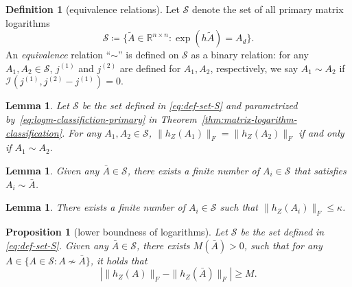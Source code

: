 \documentclass[letterpaper,10pt,journal,final]{IEEEtran}
\newtheorem{lemma}[theorem]{Lemma}
\newtheorem{proposition}[theorem]{Proposition}
\theoremstyle{definition}
\newtheorem{definition}[theorem]{Definition}
\theoremstyle{remark}
\begin{document}
\begin{definition}[equivalence relations]
  \label{def:equivalence-relation}
  Let $\mathcal{S}$ denote the set of all primary matrix logarithms
  \begin{equation}
    \label{eq:def-set-cal-S}
    \mathcal{S} \coloneqq \big\{\tilde{A} \in \mathbb{R}^{n \times n}: \exp(h \tilde{A}) = A_d \big\}.
  \end{equation}
  An \emph{equivalence} relation ``$\sim$'' is defined on $\mathcal{S}$ as a binary relation:
  for any $A_1,A_2 \in {\mathcal{S}}$, $\textit{j}^{(1)}$ and $\textit{j}^{(2)}$ are defined for $A_1, A_2$, respectively, we say $A_1 \sim A_2$ if
  \begin{math}
    \mathscr{I}(\textit{j}^{(1)}, \textit{j}^{(2)} - \textit{j}^{(1)}) = 0.
  \end{math}
\end{definition}


\begin{lemma}
  \label{lemma:logm-As-condition-equality}
  Let ${\mathcal{S}}$ be the set defined in \eqref{eq:def-set-S} and
parametrized by~\eqref{eq:logm-classifiction-primary} in Theorem~\ref{thm:matrix-logarithm-classification}.
For any $A_1, A_2 \in {\mathcal{S}}$, $\|h_Z(A_1)\|_F = \|h_Z(A_2)\|_F$ if and only if $A_1 \sim A_2$.
\end{lemma}




\begin{lemma}
  \label{lemma:finite-elements-equiv-class}
  Given any $\bar{A} \in {\mathcal{S}}$, there exists a finite number of $A_i \in {\mathcal{S}}$ that satisfies $A_i \sim \bar{A}$.
\end{lemma}


\begin{lemma}
  \label{lemma:finite-A-Fro-less-k}
  There exists a finite number of $A_i \in {\mathcal{S}}$ such that $\|h_Z(A_i)\|_F \leq \kappa$.
\end{lemma}






\begin{proposition}[lower boundness of logarithms]
  \label{thm:identifi-boundness-A}
  Let ${\mathcal{S}}$ be the set defined in \eqref{eq:def-set-S}.
Given any $\bar{A} \in {\mathcal{S}}$, there exists $M(\bar{A}) > 0$, such that for any $A \in \{A \in {\mathcal{S}} : A \nsim \bar{A} \}$, it holds that
  \begin{equation*}
    \left| \| h_Z(A) \|_F - \| h_Z(\bar{A}) \|_F \right| \geq M.
  \end{equation*}
\end{proposition}
\end{document}
